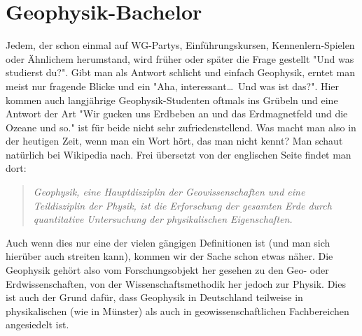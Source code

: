 
\vspace{-1cm}
\section{Geophysik-Bachelor}
\begin{multicols}{2}
Jedem, der schon einmal auf WG-Partys, Einführungskursen, Kennenlern-Spielen oder Ähnlichem herumstand, wird früher oder später die Frage gestellt "Und was studierst du?". Gibt man als Antwort schlicht und einfach Geophysik, erntet man meist nur fragende Blicke und ein "Aha, interessant\dots\ Und was ist das?". Hier kommen auch langjährige Geophysik-Studenten oftmals ins Grübeln und eine Antwort der Art "Wir gucken uns Erdbeben an und das Erdmagnetfeld und die Ozeane und so." ist für beide nicht sehr zufriedenstellend. Was macht man also in der heutigen Zeit, wenn man ein Wort hört, das man nicht kennt? Man schaut natürlich bei Wikipedia nach. Frei übersetzt von der englischen Seite findet man dort:
\begin{quote}
\textit{Geophysik, eine Hauptdisziplin der Geowissenschaften und eine Teildisziplin der Physik, ist die Erforschung der gesamten Erde durch quantitative Untersuchung der physikalischen Eigenschaften.}
\end{quote}

Auch wenn dies nur eine der vielen gängigen Definitionen ist (und man sich hierüber auch streiten kann), kommen wir der Sache schon etwas näher. Die Geophysik gehört also vom Forschungsobjekt her gesehen zu den Geo- oder Erdwissenschaften, von der Wissenschaftsmethodik her jedoch zur Physik. Dies ist auch der Grund dafür, dass Geophysik in Deutschland teilweise in physikalischen (wie in Münster) als auch in geowissenschaftlichen Fachbereichen angesiedelt ist.


\end{multicols}
